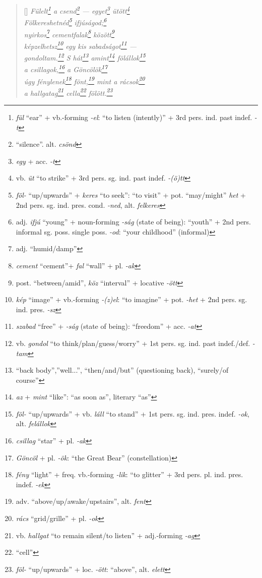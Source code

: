 \documentclass[a4paper,12pt,twoside,final]{book}
\begin{document}
\begin{verse}[\versewidth]
  \it
  Fülelt\footnote{\emph{fül} ``ear'' + vb.-forming \emph{-el}: ``to
  listen (intently)'' + 3rd pers. ind. past indef. \emph{-t}} a
  csend\footnote{``silence''. alt. \emph{csönd}}
  --- egyet\footnote{\emph{egy} + acc. \emph{-t}}
  ütött\footnote{vb. \emph{üt} ``to strike'' + 3rd
  pers. sg. ind. past indef. \emph{-(ö)tt}} \\
  Fölkereshetnéd\footnote{\emph{föl-}
  ``up/upwards'' + \emph{keres} ``to seek'': ``to visit'' +
  pot. ``may/might'' \emph{het} + 2nd
  pers. sg. ind. pres. cond. \emph{-ned}, alt. \emph{felkeres}}
  ifjúságod;\footnote{adj. \emph{ifjú} ``young'' + noun-forming
  \emph{-ság} (state of being): ``youth'' + 2nd pers. informal sg.
  poss. single poss. \emph{-od}: ``your childhood'' (informal)} \\
  nyirkos\footnote{adj. ``humid/damp''}
  cementfalak\footnote{\emph{cement} ``cement''+ \emph{fal} ``wall'' +
  pl. \emph{-ak}} között\footnote{post. ``between/amid'', \emph{köz}
  ``interval'' + locative \emph{-ött}} \\
  képzelhetsz\footnote{\emph{kép} ``image'' + vb.-forming
  \emph{-(z)el}: ``to imagine'' + pot. \emph{-het} + 2nd
  pers. sg. ind. pres. \emph{-sz}} egy kis
  sabadságot\footnote{\emph{szabad} ``free'' + \emph{-ság} (state of
  being): ``freedom'' + acc. \emph{-at}} --- \\
  gondoltam.\footnote{vb. \emph{gondol} ``to
  think/plan/guess/worry'' + 1st pers. sg. ind. past
  indef./def. \emph{-tam}} S hát\footnote{``back body'',''well...'',
  ``then/and/but'' (questioning back), ``surely/of course''}
  amint\footnote{\emph{az} + \emph{mint} ``like'': ``as soon as'',
  literary ``as''} fölállok\footnote{\emph{föl-}
  ``up/upwards'' +  vb. \emph{láll} ``to stand'' + 1st
  pers. sg. ind. pres. indef. \emph{-ok}, alt. \emph{felállok}} \\
  a csillagok,\footnote{\emph{csillag} ``star'' + pl. \emph{-ak}} a
  Göncölök\footnote{\emph{Göncöl} + pl. \emph{-ök}: ``the Great Bear''
  (constellation)} \\
  úgy fénylenek\footnote{\emph{fény} ``light'' + freq. vb.-forming
  \emph{-lik}: ``to glitter'' + 3rd
  pers. pl. ind. pres. indef. \emph{-ek}}
  fönt,\footnote{adv. ``above/up/awake/upstairs'', alt. \emph{fent}}
  mint a rácsok\footnote{\emph{rács} ``grid/grille'' + pl. \emph{-ok}} \\
  a hallgatag\footnote{vb. \emph{hallgat} ``to remain silent/to
  listen'' + adj.-forming \emph{-ag}} cella\footnote{``cell''}
  fölött.\footnote{\emph{föl-} ``up/upwards'' +  loc. \emph{-ött}:
  ``above'', alt. \emph{elett}}
\end{verse}
\end{document}
